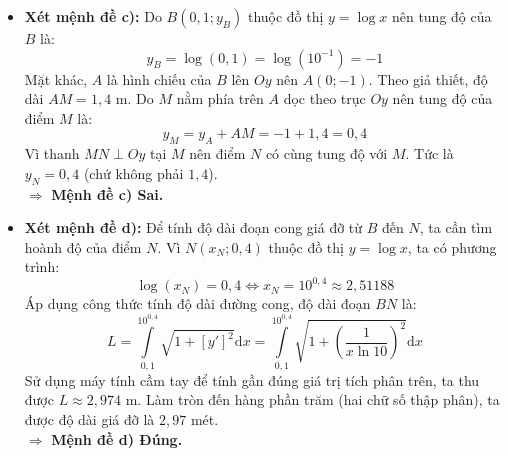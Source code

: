 \documentclass[12pt,a4paper]{article}
\begin{document}
\begin{ex}
{\begin{apdungbox}
\begin{itemize}
    \item \textbf{Xét mệnh đề c):} 
    Do $B(0{,}1; y_B)$ thuộc đồ thị $y = \log x$ nên tung độ của $B$ là:
    \[ y_B = \log(0{,}1) = \log(10^{-1}) = -1 \]
    Mặt khác, $A$ là hình chiếu của $B$ lên $Oy$ nên $A(0; -1)$.
    Theo giả thiết, độ dài $AM = 1{,}4\text{ m}$. Do $M$ nằm phía trên $A$ dọc theo trục $Oy$ nên tung độ của điểm $M$ là:
    \[ y_M = y_A + AM = -1 + 1{,}4 = 0{,}4 \]
    Vì thanh $MN \perp Oy$ tại $M$ nên điểm $N$ có cùng tung độ với $M$. Tức là $y_N = 0{,}4$ (chứ không phải $1{,}4$).\\
    $\Rightarrow$ \textbf{Mệnh đề c) Sai.}

    \item \textbf{Xét mệnh đề d):} Để tính độ dài đoạn cong giá đỡ từ $B$ đến $N$, ta cần tìm hoành độ của điểm $N$.
    Vì $N(x_N; 0{,}4)$ thuộc đồ thị $y = \log x$, ta có phương trình:
    \[ \log(x_N) = 0{,}4 \Leftrightarrow x_N = 10^{0{,}4} \approx 2{,}51188 \]
    Áp dụng công thức tính độ dài đường cong, độ dài đoạn $BN$ là:
    \[ L = \displaystyle\int\limits_{0{,}1}^{10^{0{,}4}} \sqrt{1 + [y']^2} \mathrm{d}x = \displaystyle\int\limits_{0{,}1}^{10^{0{,}4}} \sqrt{1 + \left( \displaystyle\dfrac{1}{x \ln 10} \right)^2} \mathrm{d}x \]
    Sử dụng máy tính cầm tay để tính gần đúng giá trị tích phân trên, ta thu được $L \approx 2{,}974\text{ m}$.
    Làm tròn đến hàng phần trăm (hai chữ số thập phân), ta được độ dài giá đỡ là $2{,}97$ mét.\\
    $\Rightarrow$ \textbf{Mệnh đề d) Đúng.}
\end{itemize}

\begin{center}
\end{center}
\end{apdungbox}}
\end{ex}
\end{document}
